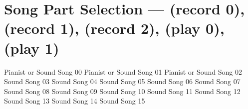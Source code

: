 \section{Song Part Selection --- \UiKey{\I}\UiKey{\REC} (record 0), \UiKey{\II}\UiKey{\REC} (record 1), \UiKey{\I}\UiKey{\II}\UiKey{\REC} (record 2), \UiKey{\I}\UiKey{\PL} (play 0), \UiKey{\II}\UiKey{\PL} (play 1)}
Pianist or Sound Song 00
Pianist or Sound Song 01
Pianist or Sound Song 02
Sound Song 03
Sound Song 04
Sound Song 05
Sound Song 06
Sound Song 07
Sound Song 08
Sound Song 09
Sound Song 10
Sound Song 11
Sound Song 12
Sound Song 13
Sound Song 14
Sound Song 15
